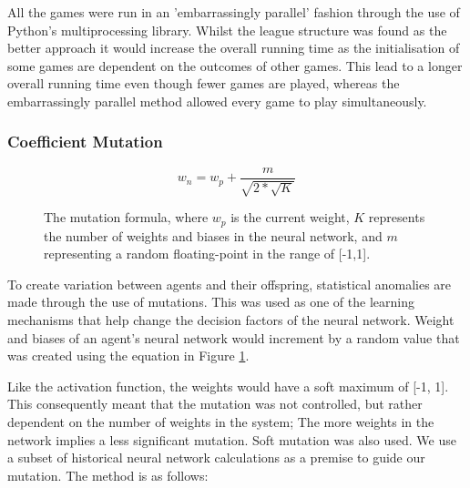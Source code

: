 \documentclass[12pt,a4paper]{article}
\begin{document}
            All the games were run in an 'embarrassingly parallel' fashion through the use of Python's multiprocessing library. Whilst the league structure was found as the better approach \cite{al-khateeb_introducing_2009} it would increase the overall running time as the initialisation of some games are dependent on the outcomes of other games. This lead to a longer overall running time even though fewer games are played, whereas the embarrassingly parallel method allowed every game to play simultaneously.
            
        \subsubsection{Coefficient Mutation} \label{coefficient_mutation}

            \begin{figure}
            \begin{equation}
                w_n = w_p + \frac{m}{\sqrt{2 * \sqrt{K} }}
            \end{equation}
            \caption{The mutation formula, where $w_p$ is the current weight, $K$ represents the number of weights and biases in the neural network, and $m$ representing a random floating-point in the range of [-1,1].\label{mutation}}
            \end{figure}

            To create variation between agents and their offspring, statistical anomalies are made through the use of mutations. This was used as one of the learning mechanisms that help change the decision factors of the neural network. Weight and biases of an agent's neural network would increment by a random value that was created using the equation in Figure \ref{mutation}.

            Like the activation function,
            the weights would have a soft maximum of [-1, 1]. This consequently meant that the mutation was not controlled, but rather dependent on the number of weights in the system; The more weights in the network implies a less significant mutation. Soft mutation \cite{lehman_safe_2017} was also used. We use a subset of historical neural network calculations as a premise to guide our mutation. The method is as follows:
             
\end{document}
